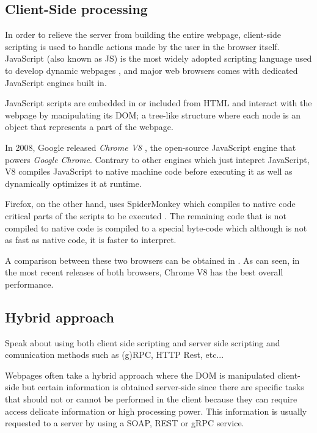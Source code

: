 \subsection{Client-Side processing}
In order to relieve the server from building the entire webpage, client-side scripting is used to handle actions made by the user in the browser itself. JavaScript (also known as JS) is the most widely adopted scripting language used to develop dynamic webpages \cite{js_stats}, and major web browsers comes with dedicated JavaScript engines built in.  

JavaScript scripts are embedded in or included from HTML and interact with the webpage by manipulating its DOM; a tree-like structure where each node is an object that represents a part of the webpage. 

In 2008, Google released \textit{Chrome V8} \cite{chrome_v8}, the open-source JavaScript engine that powers \textit{Google Chrome}. Contrary to other engines which just intepret JavaScript, V8 compiles JavaScript to native machine code before executing it as well as dynamically optimizes it at runtime.

Firefox, on the other hand, uses SpiderMonkey which compiles to native code critical parts of the scripts to be executed \cite{tampermoneky}. The remaining code that is not compiled to native code is compiled to a special byte-code which although is not as fast as native code, it is faster to interpret.

A comparison between these two browsers can be obtained in \cite{firefox_benchmark}. As can seen, in the most recent releases of both browsers, Chrome V8 has the best overall performance.

\subsection{Hybrid approach}
Speak about using both client side scripting and server side scripting and comunication methods such as (g)RPC, HTTP Rest, etc...

Webpages often take a hybrid approach where the DOM is manipulated client-side but certain information is obtained server-side since there are specific tasks that should not or cannot be performed in the client because they can require access delicate information or high processing power. This information is usually requested to a server by using a SOAP, REST or gRPC service.

